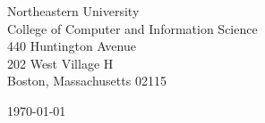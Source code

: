 \begin{minipage}{0.49\textwidth}
\begin{flushleft}
\noindent
Northeastern University\\
College of Computer and Information Science\\
440 Huntington Avenue\\
202 West Village H\\
Boston, Massachusetts 02115
\end{flushleft}
\end{minipage}
\begin{minipage}{0.47\textwidth}
\begin{flushright}
\today
\end{flushright}
\end{minipage} \\

\newcommand{\univ}{Northeastern University}
\newcommand{\univshort}{NEU}
\newcommand{\degree}{Ph.D.}
\newcommand{\dept}{Computer Science}
